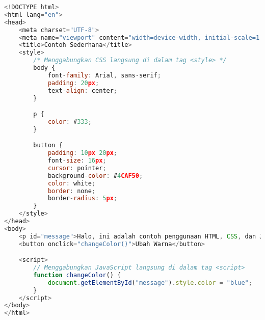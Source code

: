 \begin{lstlisting}[language=Javascript,caption={HTML, CSS dan JavaScript}]
<!DOCTYPE html>
<html lang="en">
<head>
    <meta charset="UTF-8">
    <meta name="viewport" content="width=device-width, initial-scale=1.0">
    <title>Contoh Sederhana</title>
    <style>
        /* Menggabungkan CSS langsung di dalam tag <style> */
        body {
            font-family: Arial, sans-serif;
            padding: 20px;
            text-align: center;
        }

        p {
            color: #333;
        }

        button {
            padding: 10px 20px;
            font-size: 16px;
            cursor: pointer;
            background-color: #4CAF50;
            color: white;
            border: none;
            border-radius: 5px;
        }
    </style>
</head>
<body>
    <p id="message">Halo, ini adalah contoh penggunaan HTML, CSS, dan JavaScript!</p>
    <button onclick="changeColor()">Ubah Warna</button>

    <script>
        // Menggabungkan JavaScript langsung di dalam tag <script>
        function changeColor() {
            document.getElementById("message").style.color = "blue";
        }
    </script>
</body>
</html>
\end{lstlisting}